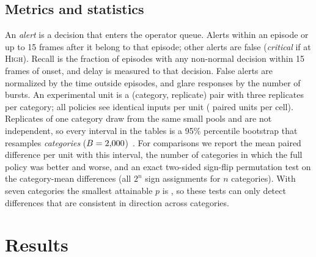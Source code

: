 \documentclass[conference]{IEEEtran}
\begin{document}
\subsection{Metrics and statistics}
An \emph{alert} is a decision that enters the operator queue. Alerts within an episode or up to 15 frames after it belong to that episode; other alerts are false (\emph{critical} if at \textsc{High}). Recall is the fraction of episodes with any non-normal decision within 15 frames of onset, and delay is measured to that decision. False alerts are normalized by the time outside episodes, and glare responses by the number of bursts. An experimental unit is a (category, replicate) pair with three replicates per category; all policies see identical inputs per unit (\UnitsPerCell{} paired units per cell). Replicates of one category draw from the same small pools and are not independent, so every interval in the tables is a 95\% percentile bootstrap that resamples \emph{categories} ($B=2{,}000$)~\cite{field2007clustered}. For comparisons we report the mean paired difference per unit with this interval, the number of categories in which the full policy was better and worse, and an exact two-sided sign-flip permutation test on the category-mean differences (all $2^{n}$ sign assignments for $n$ categories). With seven categories the smallest attainable $p$ is \PermMinPMvtec{}, so these tests can only detect differences that are consistent in direction across categories.

\section{Results}
\begin{table}[!t]
\centering
\caption{Means over \UnitsPerCell{} paired units (independent frame scores). FA/h: false alerts per hour outside episodes. Alerts/burst: alerts per 1--3 frame glare burst. Alerts/ep.: alerts per sustained-defect episode (1 is ideal). Recall: share of episodes with a non-normal decision within 15 frames of onset (sustained defects; multi-modal faults). Crit.\ FA/h: false alerts at \textsc{High}. Rows below the line are external baselines. Category-level intervals are in Tables~\ref{tab:effects} and~\ref{tab:percat}.}
\label{tab:ablation}
\small\setlength{\tabcolsep}{4pt}

\end{table}
\end{document}
